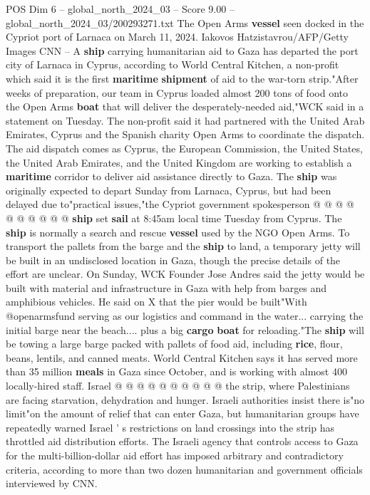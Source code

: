 \begin{textsample}{POS Dim 6 – global\_north\_2024\_03 – Score 9.00 – global\_north\_2024\_03/200293271.txt}  \label{ex:f6_pos_059}
The Open Arms \textbf{vessel} seen docked in the Cypriot port of Larnaca on March 11, 2024.
Iakovos Hatzistavrou/AFP/Getty Images CNN -- A \textbf{ship} carrying humanitarian aid to Gaza has departed the port city of Larnaca in Cyprus, according to World Central Kitchen, a non-profit which said it is the first \textbf{maritime} \textbf{shipment} of aid to the war-torn strip."After weeks of preparation, our team in Cyprus loaded almost 200 tons of food onto the Open Arms \textbf{boat} that will deliver the desperately-needed aid,"WCK said in a statement on Tuesday.
The non-profit said it had partnered with the United Arab Emirates, Cyprus and the Spanish charity Open Arms to coordinate the dispatch.
The aid dispatch comes as Cyprus, the European Commission, the United States, the United Arab Emirates, and the United Kingdom are working to establish a \textbf{maritime} corridor to deliver aid assistance directly to Gaza.
The \textbf{ship} was originally expected to depart Sunday from Larnaca, Cyprus, but had been delayed due to"practical issues,"the Cypriot government spokesperson @ @ @ @ @ @ @ @ @ @ \textbf{ship} set \textbf{sail} at 8:45am local time Tuesday from Cyprus.
The \textbf{ship} is normally a search and rescue \textbf{vessel} used by the NGO Open Arms.
To transport the pallets from the barge and the \textbf{ship} to land, a temporary jetty will be built in an undisclosed location in Gaza, though the precise details of the effort are unclear.
On Sunday, WCK Founder Jose Andres said the jetty would be built with material and infrastructure in Gaza with help from barges and amphibious vehicles.
He said on X that the pier would be built"With @openarmsfund serving as our logistics and command in the water... carrying the initial barge near the beach.... plus a big \textbf{cargo} \textbf{boat} for reloading."The \textbf{ship} will be towing a large barge packed with pallets of food aid, including \textbf{rice}, flour, beans, lentils, and canned meats.
World Central Kitchen says it has served more than 35 million \textbf{meals} in Gaza since October, and is working with almost 400 locally-hired staff.
Israel @ @ @ @ @ @ @ @ @ @ the strip, where Palestinians are facing starvation, dehydration and hunger.
Israeli authorities insist there is"no limit"on the amount of relief that can enter Gaza, but humanitarian groups have repeatedly warned Israel ' s restrictions on land crossings into the strip has throttled aid distribution efforts.
The Israeli agency that controls access to Gaza for the multi-billion-dollar aid effort has imposed arbitrary and contradictory criteria, according to more than two dozen humanitarian and government officials interviewed by CNN.

\end{textsample}
